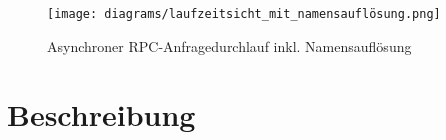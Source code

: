 \begin{figure}[htbp]
	\centering
	\texttt{[image: diagrams/laufzeitsicht\_mit\_namensauflösung.png]}
	\caption{Asynchroner RPC-Anfragedurchlauf inkl. Namensauflösung}
	\label{fig:meine-abbildung}
\end{figure}


\section*{Beschreibung}



